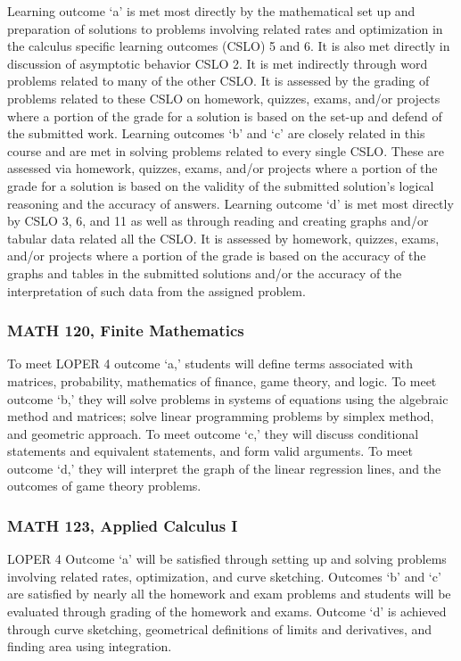 \documentclass[11pt]{article}
\begin{document}
Learning outcome `a' is met most directly by the mathematical set up 
and preparation of solutions to problems involving related rates and 
optimization in the calculus specific learning outcomes (CSLO) 5 
and 6. It is also met directly in discussion of asymptotic behavior 
CSLO 2. It is met indirectly through word problems related to many 
of the other CSLO. It is assessed by the grading of problems related 
to these CSLO on homework, quizzes, exams, and/or projects where a portion of the grade for a solution is based on the set-up and defend of the submitted work.
Learning outcomes `b' and `c' are closely related in this course and 
are met in solving problems related to every single CSLO. These are assessed via homework, quizzes, exams, and/or projects where a portion of the grade for a solution is based on the validity of the submitted solution’s logical reasoning and the accuracy of answers.
Learning outcome `d' is met most directly by CSLO 3, 6, and 11 as 
well as through reading and creating graphs and/or tabular data 
related all the CSLO. It is assessed by homework, quizzes, exams, 
and/or projects where a portion of the grade is based on the accuracy 
of the graphs and tables in the submitted solutions and/or the 
accuracy of the interpretation of such data from the assigned problem.

\subsubsection{MATH 120, Finite Mathematics} 

To meet LOPER 4 outcome `a,' students will define terms 
associated with matrices, probability, mathematics of finance, game 
theory, and logic. To meet outcome `b,' they will solve problems in 
systems of equations using the algebraic method and matrices; solve 
linear programming problems by simplex method, and geometric approach.
 To meet outcome `c,' they will discuss conditional statements and 
 equivalent statements, and form valid arguments. To meet outcome `d,'
  they will interpret the graph of the linear regression lines, and 
  the outcomes of game theory problems.  
 
\subsubsection{MATH 123, Applied Calculus I} 

LOPER 4 Outcome `a' will be satisfied through 
setting up and solving problems involving related rates, 
optimization, and curve sketching. Outcomes `b' and `c' are 
satisfied by nearly all the homework and exam problems and 
students will be evaluated through grading of the homework and 
exams. Outcome `d' is achieved through curve sketching, geometrical 
definitions of limits and derivatives, and finding area using 
integration. 
\end{document}
